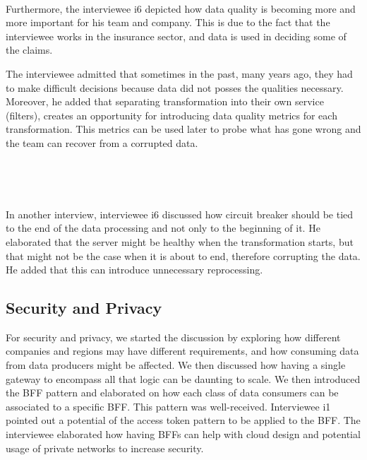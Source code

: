 \documentclass{bmcart}
\begin{document}
\setlength{\fboxsep}{0.7em}
\noindent{}

\,

Furthermore, the interviewee i6 depicted how data quality is becoming more and more important for his team and company. This is due to the fact that the interviewee works in the insurance sector, and data is used in deciding some of the claims. 

The interviewee admitted that sometimes in the past, many years ago, they had to make difficult decisions because data did not posses the qualities necessary. Moreover, he added that separating transformation into their own service (filters), creates an opportunity for introducing data quality metrics for each transformation. This metrics can be used later to probe what has gone wrong and the team can recover from a corrupted data.


\,

\setlength{\fboxsep}{0.7em}
\noindent{}

\,

In another interview, interviewee i6 discussed how circuit breaker should be tied to the end of the data processing and not only to the beginning of it. He elaborated that the server might be healthy when the transformation starts, but that might not be the case when it is about to end, therefore corrupting the data. He added that this can introduce unnecessary reprocessing. 

\subsection{Security and Privacy}

For security and privacy, we started the discussion by exploring how different companies and regions may have different requirements, and how consuming data from data producers might be affected. We then discussed how having a single gateway to encompass all that logic can be daunting to scale. We then introduced the BFF pattern and elaborated on how each class of data consumers can be associated to a specific BFF. This pattern was well-received. Interviewee i1 pointed out a potential of the access token pattern to be applied to the BFF. The interviewee elaborated how having BFFs can help with cloud design and potential usage of private networks to increase security. 
\end{document}
